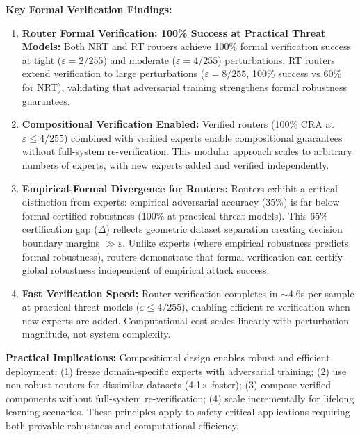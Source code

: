 \documentclass[11pt,a4paper]{article}
\begin{document}
\textbf{Key Formal Verification Findings:}
\begin{enumerate}
    \item \textbf{Router Formal Verification: 100\% Success at Practical Threat Models:} Both NRT and RT routers achieve 100\% formal verification success at tight ($\varepsilon = 2/255$) and moderate ($\varepsilon = 4/255$) perturbations. RT routers extend verification to large perturbations ($\varepsilon = 8/255$, 100\% success vs 60\% for NRT), validating that adversarial training strengthens formal robustness guarantees.

    \item \textbf{Compositional Verification Enabled:} Verified routers (100\% CRA at $\varepsilon \leq 4/255$) combined with verified experts enable compositional guarantees without full-system re-verification. This modular approach scales to arbitrary numbers of experts, with new experts added and verified independently.

    \item \textbf{Empirical-Formal Divergence for Routers:} Routers exhibit a critical distinction from experts: empirical adversarial accuracy (35\%) is far below formal certified robustness (100\% at practical threat models). This 65\% certification gap ($\Delta$) reflects geometric dataset separation creating decision boundary margins $\gg \varepsilon$. Unlike experts (where empirical robustness predicts formal robustness), routers demonstrate that formal verification can certify global robustness independent of empirical attack success.

    \item \textbf{Fast Verification Speed:} Router verification completes in $\sim$4.6s per sample at practical threat models ($\varepsilon \leq 4/255$), enabling efficient re-verification when new experts are added. Computational cost scales linearly with perturbation magnitude, not system complexity.
\end{enumerate}

\textbf{Practical Implications:} Compositional design enables robust and efficient deployment: (1) freeze domain-specific experts with adversarial training; (2) use non-robust routers for dissimilar datasets (4.1$\times$ faster); (3) compose verified components without full-system re-verification; (4) scale incrementally for lifelong learning scenarios. These principles apply to safety-critical applications requiring both provable robustness and computational efficiency.
\end{document}
